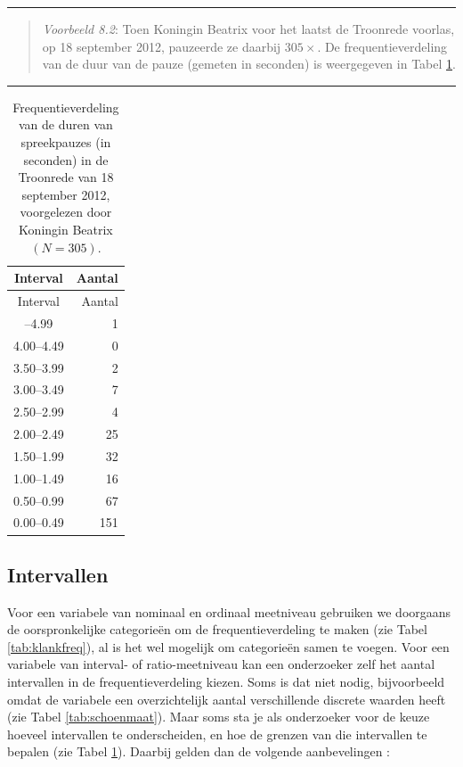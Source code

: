 \documentclass[
]{book}
\begin{document}
\begin{center}\rule{0.5\linewidth}{0.5pt}\end{center}

\begin{quote}
\emph{Voorbeeld 8.2}: Toen Koningin Beatrix voor het laatst de Troonrede voorlas,
op 18 september 2012, pauzeerde ze daarbij \(305\times\). De frequentieverdeling
van de duur van de pauze (gemeten in seconden) is weergegeven in
Tabel \ref{tab:troonrede2012pauzes}.
\end{quote}

\begin{center}\rule{0.5\linewidth}{0.5pt}\end{center}

\begin{longtable}[]{@{}cr@{}}
\caption{\label{tab:troonrede2012pauzes} Frequentieverdeling van de duren van spreekpauzes (in seconden) in de Troonrede van 18 september 2012, voorgelezen door Koningin Beatrix \((N=305)\).}\tabularnewline
\toprule\noalign{}
Interval & Aantal \\
\midrule\noalign{}
\endfirsthead
\toprule\noalign{}
Interval & Aantal \\
\midrule\noalign{}
\endhead
\bottomrule\noalign{}
\endlastfoot
4.50--4.99 & 1 \\
4.00--4.49 & 0 \\
3.50--3.99 & 2 \\
3.00--3.49 & 7 \\
2.50--2.99 & 4 \\
2.00--2.49 & 25 \\
1.50--1.99 & 32 \\
1.00--1.49 & 16 \\
0.50--0.99 & 67 \\
0.00--0.49 & 151 \\
\end{longtable}

\subsection{Intervallen}\label{sec:intervallen}

Voor een variabele van nominaal en ordinaal meetniveau gebruiken we
doorgaans de oorspronkelijke categorieën om de frequentieverdeling te
maken (zie Tabel \ref{tab:klankfreq}), al is het wel mogelijk om categorieën samen
te voegen. Voor een variabele van interval- of ratio-meetniveau kan een
onderzoeker zelf het aantal intervallen in de frequentieverdeling
kiezen. Soms is dat niet nodig, bijvoorbeeld omdat de variabele een
overzichtelijk aantal verschillende discrete waarden heeft (zie
Tabel \ref{tab:schoenmaat}). Maar soms sta je als onderzoeker
voor de keuze hoeveel intervallen te onderscheiden, en hoe de grenzen
van die intervallen te bepalen (zie Tabel \ref{tab:troonrede2012pauzes}).
Daarbij gelden dan de volgende aanbevelingen \citep[Ch.2]{Ferg89}:
\end{document}
